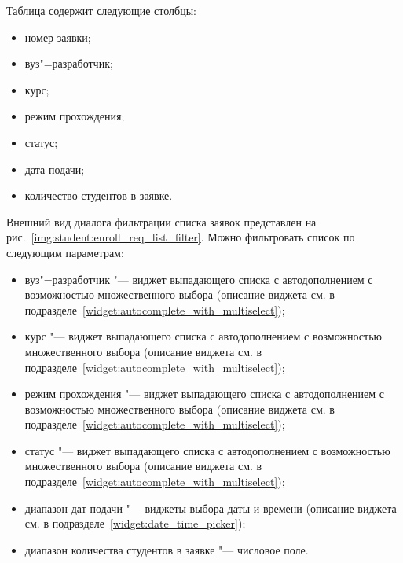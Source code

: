 Таблица содержит следующие столбцы:
\begin{itemize}
	\item номер заявки;
	\item вуз"=разработчик;
	\item курс;
	\item режим прохождения;
	\item статус;
	\item дата подачи;
	\item количество студентов в заявке.
\end{itemize}

Внешний вид диалога фильтрации списка заявок представлен на рис.~\ref{img:student:enroll_req_list_filter}.
Можно фильтровать список по следующим параметрам:
\begin{itemize}
	\item вуз"=разработчик "--- виджет выпадающего списка с автодополнением с возможностью множественного выбора 
	(описание виджета см. в подразделе~\ref{widget:autocomplete_with_multiselect});
	\item курс "--- виджет выпадающего списка с автодополнением с возможностью множественного выбора 
	(описание виджета см. в подразделе~\ref{widget:autocomplete_with_multiselect});
	\item режим прохождения "--- виджет выпадающего списка с автодополнением с возможностью множественного выбора 
	(описание виджета см. в подразделе~\ref{widget:autocomplete_with_multiselect});
	\item статус "--- виджет выпадающего списка с автодополнением с возможностью множественного выбора 
	(описание виджета см. в подразделе~\ref{widget:autocomplete_with_multiselect});
	\item диапазон дат подачи "--- виджеты выбора даты и времени 
	(описание виджета см. в подразделе~\ref{widget:date_time_picker});
	\item диапазон количества студентов в заявке "--- числовое поле.
\end{itemize}

